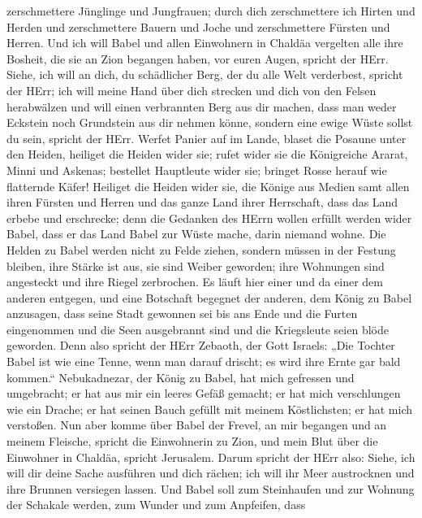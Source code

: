 zerschmettere Jünglinge und Jungfrauen;  durch dich
zerschmettere ich Hirten und Herden und zerschmettere Bauern und Joche
und zerschmettere Fürsten und Herren.  Und ich will Babel
und allen Einwohnern in Chaldäa vergelten alle ihre Bosheit, die sie an
Zion begangen haben, vor euren Augen, spricht der HErr. 
Siehe, ich will an dich, du schädlicher Berg, der du alle Welt
verderbest, spricht der HErr; ich will meine Hand über dich strecken und
dich von den Felsen herabwälzen und will einen verbrannten Berg aus dir
machen,  dass man weder Eckstein noch Grundstein aus dir
nehmen könne, sondern eine ewige Wüste sollst du sein, spricht der HErr.
 Werfet Panier auf im Lande, blaset die Posaune unter den
Heiden, heiliget die Heiden wider sie; rufet wider sie die Königreiche
Ararat, Minni und Askenas; bestellet Hauptleute wider sie; bringet Rosse
herauf wie flatternde Käfer!  Heiliget die Heiden wider
sie, die Könige aus Medien samt allen ihren Fürsten und Herren und das
ganze Land ihrer Herrschaft,  dass das Land erbebe und
erschrecke; denn die Gedanken des HErrn wollen erfüllt werden wider
Babel, dass er das Land Babel zur Wüste mache, darin niemand wohne.
 Die Helden zu Babel werden nicht zu Felde ziehen, sondern
müssen in der Festung bleiben, ihre Stärke ist aus, sie sind Weiber
geworden; ihre Wohnungen sind angesteckt und ihre Riegel zerbrochen.
 Es läuft hier einer und da einer dem anderen entgegen, und
eine Botschaft begegnet der anderen, dem König zu Babel anzusagen, dass
seine Stadt gewonnen sei bis ans Ende  und die Furten
eingenommen und die Seen ausgebrannt sind und die Kriegsleute seien
blöde geworden.  Denn also spricht der HErr Zebaoth, der
Gott Israels: „Die Tochter Babel ist wie eine Tenne, wenn man darauf
drischt; es wird ihre Ernte gar bald kommen.`` 
Nebukadnezar, der König zu Babel, hat mich gefressen und umgebracht; er
hat aus mir ein leeres Gefäß gemacht; er hat mich verschlungen wie ein
Drache; er hat seinen Bauch gefüllt mit meinem Köstlichsten; er hat mich
verstoßen.  Nun aber komme über Babel der Frevel, an mir
begangen und an meinem Fleische, spricht die Einwohnerin zu Zion, und
mein Blut über die Einwohner in Chaldäa, spricht Jerusalem.
 Darum spricht der HErr also: Siehe, ich will dir deine
Sache ausführen und dich rächen; ich will ihr Meer austrocknen und ihre
Brunnen versiegen lassen.  Und Babel soll zum Steinhaufen
und zur Wohnung der Schakale werden, zum Wunder und zum Anpfeifen, dass
